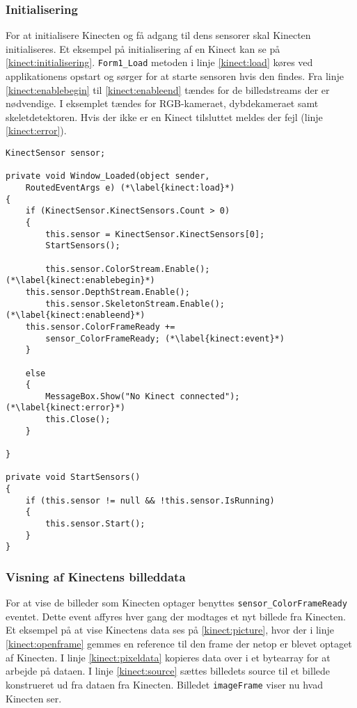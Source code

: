\subsubsection{Initialisering}
For at initialisere Kinecten og få adgang til dens sensorer skal Kinecten initialiseres.
Et eksempel på initialisering af en Kinect kan se på \cref{kinect:initialisering}. \lstinline[style=csharp]|Form1_Load| metoden i linje \ref{kinect:load} køres ved applikationens opstart og sørger for at starte sensoren hvis den findes. Fra linje \ref{kinect:enablebegin} til \ref{kinect:enableend} tændes for de billedstreams der er nødvendige. I eksemplet tændes for RGB-kameraet, dybdekameraet samt skeletdetektoren. Hvis der ikke er en Kinect tilsluttet meldes der fejl (linje \ref{kinect:error}).

\begin{lstlisting}[style=csharp, label=kinect:initialisering, caption={Initialisering af en Kinect sensor}]
KinectSensor sensor;

private void Window_Loaded(object sender,
	RoutedEventArgs e) (*\label{kinect:load}*)
{
    if (KinectSensor.KinectSensors.Count > 0)
    {
        this.sensor = KinectSensor.KinectSensors[0];
        StartSensors();
        
        this.sensor.ColorStream.Enable();(*\label{kinect:enablebegin}*)    
	this.sensor.DepthStream.Enable();
        this.sensor.SkeletonStream.Enable();(*\label{kinect:enableend}*)
	this.sensor.ColorFrameReady += 
		sensor_ColorFrameReady; (*\label{kinect:event}*)
    }

    else
    {
        MessageBox.Show("No Kinect connected"); (*\label{kinect:error}*)
        this.Close();
    }

}

private void StartSensors()
{
    if (this.sensor != null && !this.sensor.IsRunning)
    {
        this.sensor.Start();
    }
}
\end{lstlisting}

\subsubsection{Visning af Kinectens billeddata}
For at vise de billeder som Kinecten optager benyttes \lstinline[style=csharp]!sensor_ColorFrameReady! eventet. 
Dette event affyres hver gang der modtages et nyt billede fra Kinecten. 
Et eksempel på at vise Kinectens data ses på \cref{kinect:picture}, hvor der i linje \ref{kinect:openframe} gemmes en reference til den frame der netop er blevet optaget af Kinecten.
I linje \ref{kinect:pixeldata} kopieres data over i et bytearray for at arbejde på dataen. 
I linje \ref{kinect:source} sættes billedets source til et billede konstrueret ud fra dataen fra Kinecten.
Billedet \lstinline[style=csharp]|imageFrame| viser nu hvad Kinecten ser.

